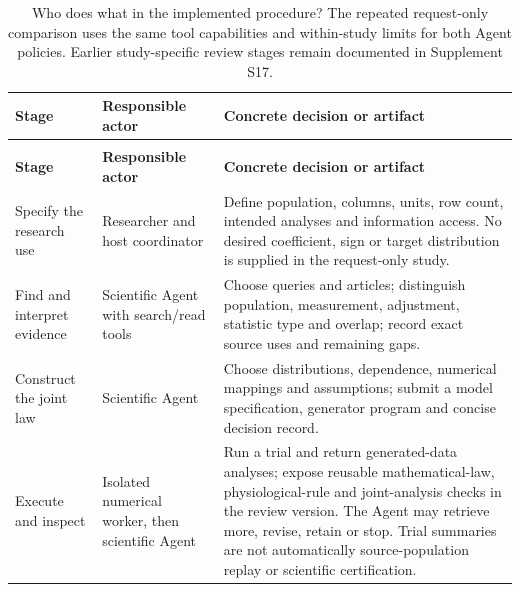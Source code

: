 \documentclass[11pt,letterpaper]{article}
\begin{document}
\begin{xltabular}{\linewidth}{@{}>{\raggedright\arraybackslash}X>{\raggedright\arraybackslash}X>{\raggedright\arraybackslash}X@{}}

\caption{Who does what in the implemented procedure? The repeated request-only comparison uses the same tool capabilities and within-study limits for both Agent policies. Earlier study-specific review stages remain documented in Supplement S17.}\label{tab:1} \\

\toprule

\textbf{Stage} & \textbf{Responsible actor} & \textbf{Concrete decision or artifact} \\

\midrule

\endfirsthead

\\

\toprule

\textbf{Stage} & \textbf{Responsible actor} & \textbf{Concrete decision or artifact} \\

\midrule

\endhead

\bottomrule

\endfoot

Specify the research use & Researcher and host coordinator & Define population, columns, units, row count, intended analyses and information access. No desired coefficient, sign or target distribution is supplied in the request-only study. \\

Find and interpret evidence & Scientific Agent with search/\allowbreak{}read tools & Choose queries and articles; distinguish population, measurement, adjustment, statistic type and overlap; record exact source uses and remaining gaps. \\

Construct the joint law & Scientific Agent & Choose distributions, dependence, numerical mappings and assumptions; submit a model specification, generator program and concise decision record. \\

Execute and inspect & Isolated numerical worker, then scientific Agent & Run a trial and return generated-data analyses; expose reusable mathematical-law, physiological-rule and joint-analysis checks in the review version. The Agent may retrieve more, revise, retain or stop. Trial summaries are not automatically source-population replay or scientific certification. \\


\end{xltabular}
\end{document}
